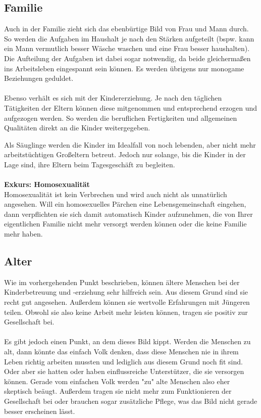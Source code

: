 \subsection{Familie}
Auch in der Familie zieht sich das ebenbürtige Bild von Frau und Mann durch. So werden die Aufgaben im Haushalt je nach den Stärken aufgeteilt (bspw. kann ein Mann vermutlich besser Wäsche waschen und eine Frau besser haushalten). 
Die Aufteilung der Aufgaben ist dabei sogar notwendig, da beide gleichermaßen ins Arbeitsleben eingespannt sein können. 
Es werden übrigens nur monogame Beziehungen geduldet.
\\
\\
Ebenso verhält es sich mit der Kindererziehung. 
Je nach den täglichen Tätigkeiten der Eltern können diese mitgenommen und entsprechend erzogen und aufgezogen werden. 
So werden die beruflichen Fertigkeiten und allgemeinen Qualitäten direkt an die Kinder weitergegeben.

Als Säuglinge werden die Kinder im Idealfall von noch lebenden, aber nicht mehr arbeitstüchtigen Großeltern betreut. 
Jedoch nur solange, bis die Kinder in der Lage sind, ihre Eltern beim Tagesgeschäft zu begleiten.
\\
\\
\textbf{Exkurs: Homosexualität}\\
Homosexualität ist kein Verbrechen und wird auch nicht als unnatürlich angesehen. 
Will ein homosexuelles Pärchen eine Lebensgemeinschaft eingehen, dann verpflichten sie sich damit automatisch Kinder aufzunehmen, die von Ihrer eigentlichen Familie nicht mehr versorgt werden können oder die keine Familie mehr haben.

\subsection{Alter}
Wie im vorhergehenden Punkt beschrieben, können ältere Menschen bei der Kinderbetreuung und -erziehung sehr hilfreich sein. 
Aus diesem Grund sind sie recht gut angesehen. Außerdem können sie wertvolle Erfahrungen mit Jüngeren teilen. 
Obwohl sie also keine Arbeit mehr leisten können, tragen sie positiv zur Gesellschaft bei.
\\
\\
Es gibt jedoch einen Punkt, an dem dieses Bild kippt. 
Werden die Menschen zu alt, dann könnte das einfach Volk denken, dass diese Menschen nie in ihrem Leben richtig arbeiten mussten und lediglich aus diesem Grund noch fit sind. 
Oder aber sie hatten oder haben einflussreiche Unterstützer, die sie versorgen können. 
Gerade vom einfachen Volk werden "zu" alte Menschen also eher skeptisch beäugt. 
Außerdem tragen sie nicht mehr zum Funktionieren der Gesellschaft bei oder brauchen sogar zusätzliche Pflege, was das Bild nicht gerade besser erscheinen lässt.

